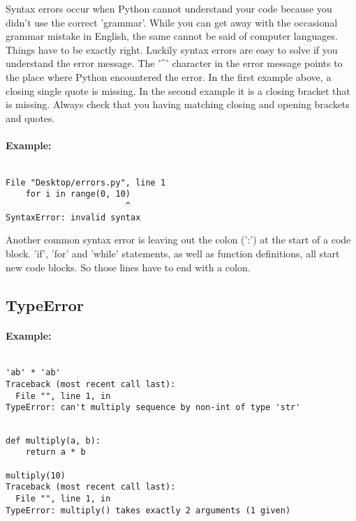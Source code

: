 Syntax errors occur when Python cannot understand your code because you didn't use the correct 'grammar'. While you can                 get away with the occasional grammar mistake in English, the same cannot be said of computer languages. Things have to be                 exactly right. Luckily syntax errors are easy to solve if you understand the error message. The '\textasciicircum' character in the error message                 points to the place where Python encountered the error. In the                 first example above, a closing single quote is missing. In the second example it is a closing bracket that is missing.                 Always check that you having matching closing and opening brackets and quotes.

\paragraph{Example:}
\begin{lstlisting}

File "Desktop/errors.py", line 1
    for i in range(0, 10)
                        ^
SyntaxError: invalid syntax\end{lstlisting}

Another common syntax error is leaving out the colon (':') at the start of a code block. 'if', 'for' and 'while' statements, as well as function                 definitions, all start new code blocks. So those lines have to end with a colon.

\subsection{TypeError}

\paragraph{Example:}
\begin{lstlisting}

'ab' * 'ab'
Traceback (most recent call last):
  File "", line 1, in 
TypeError: can't multiply sequence by non-int of type 'str'\end{lstlisting}
\begin{lstlisting}

def multiply(a, b):
    return a * b

multiply(10)
Traceback (most recent call last):
  File "", line 1, in 
TypeError: multiply() takes exactly 2 arguments (1 given)\end{lstlisting}

